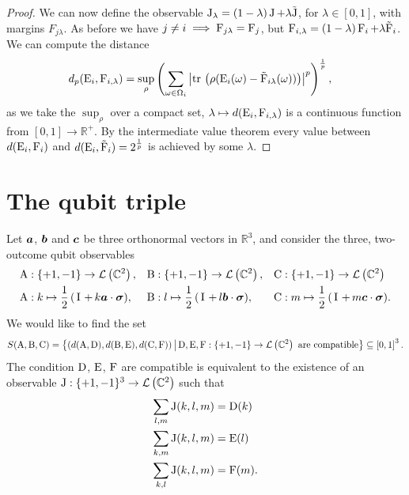 \begin{lem}
\begin{proof}
    We can now define the observable $\operatorname{J}_\lambda = (1-\lambda) \operatorname{J} + \lambda \tilde{\operatorname{J}}$, for $\lambda\in[0,1]$, with margins $F_{j \lambda}$. As before we have $j\neq i \implies \operatorname{F}_{j\lambda} = \operatorname{F}_j$, but $\operatorname{F}_{i,\lambda} = (1-\lambda)\operatorname{F}_i + \lambda \tilde{\operatorname{F}}_i$. We can compute the distance
    \begin{align}
      d_p(\ope_i, \opf_{i,\lambda}) &= \sup_\rho\left(\sum_{\omega\in\Omega_i}\abs{\tr{\rho(\ope_i(\omega)- \tilde{\opf}_{i\lambda}(\omega))}}^p\right)^\frac{1}{p},
    \end{align}
    as we take the $\sup_\rho$ over a compact set, $\lambda\mapsto d(\operatorname{E}_i,\operatorname{F}_{i,\lambda})$ is a continuous function from $[0,1]\to\mathbb{R}^+$. By the intermediate value theorem every value between $d(\operatorname{E}_i, \operatorname{F}_{i})$ and $d(\operatorname{E}_i, \tilde{\operatorname{F}}_i) = 2^\frac{1}{p}$ is achieved by some $\lambda$.
  \end{proof}
\end{lem}


\section{The qubit triple}
\label{sec:qubit-triple}
Let $\bm{a}$, $\bm{b}$ and $\bm{c}$ be three orthonormal vectors in $\mathbb{R}^3$, and consider the three, two-outcome qubit observables
\begin{align}
  \opa&:\{+1, -1\} \to \mathcal{L}\left(\mathbb{C}^2\right), & \opb&:\{+1, -1\} \to \mathcal{L}\left(\mathbb{C}^2\right), & \opc&:\{+1, -1\} \to \mathcal{L}\left(\mathbb{C}^2\right)\\
  \opa&:k\mapsto \qbit{k\boa}, &\opb&:l\mapsto \qbit{l\bob}, &\opc&:m\mapsto \qbit{m\boc}.
\end{align}
We would like to find the set
\begin{equation}
  S(\operatorname{A}, \operatorname{B}, \operatorname{C}) = \left\{(d(\operatorname{A}, \operatorname{D}), d(\operatorname{B}, \operatorname{E}), d(\operatorname{C}, \operatorname{F}))\,\middle|\,\operatorname{D}, \operatorname{E}, \operatorname{F}:\{+1, -1\}\to\mathcal{L}\left(\mathbb{C}^2\right) \text{ are compatible}\right\}\subseteq \left[0,1\right]^3.
\end{equation}
The condition $\operatorname{D}$, $\operatorname{E}$, $\operatorname{F}$ are compatible is equivalent to the existence of an observable $\operatorname{J}:\{+1,-1\}^3\to\mathcal{L}\left(\mathbb{C}^2\right)$ such that
\begin{align}
  \sum_{l,m}\operatorname{J}(k,l,m) &= \operatorname{D}(k)\\
  \sum_{k,m}\operatorname{J}(k,l,m) &= \operatorname{E}(l)\\
  \sum_{k,l}\operatorname{J}(k,l,m) &= \operatorname{F}(m).
\end{align}


